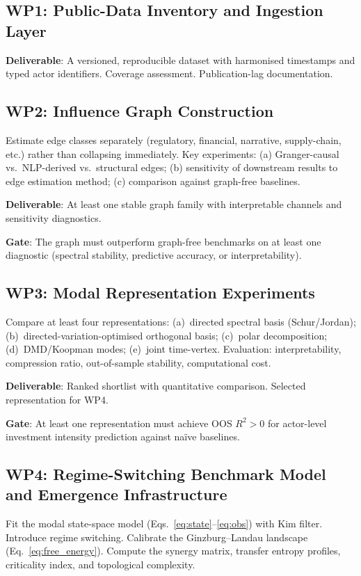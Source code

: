 \documentclass[11pt,a4paper]{article}
\theoremstyle{definition}
\begin{document}
\subsection{WP1: Public-Data Inventory and Ingestion Layer}
\textbf{Deliverable}: A versioned, reproducible dataset with harmonised timestamps and typed actor identifiers. Coverage assessment. Publication-lag documentation.

\subsection{WP2: Influence Graph Construction}
Estimate edge classes separately (regulatory, financial, narrative, supply-chain, etc.) rather than collapsing immediately. Key experiments: (a) Granger-causal vs.\ NLP-derived vs.\ structural edges; (b) sensitivity of downstream results to edge estimation method; (c) comparison against graph-free baselines.

\textbf{Deliverable}: At least one stable graph family with interpretable channels and sensitivity diagnostics.

\textbf{Gate}: The graph must outperform graph-free benchmarks on at least one diagnostic (spectral stability, predictive accuracy, or interpretability).

\subsection{WP3: Modal Representation Experiments}
Compare at least four representations: (a)~directed spectral basis (Schur/Jordan); (b)~directed-variation-optimised orthogonal basis; (c)~polar decomposition; (d)~DMD/Koopman modes; (e)~joint time-vertex. Evaluation: interpretability, compression ratio, out-of-sample stability, computational cost.

\textbf{Deliverable}: Ranked shortlist with quantitative comparison. Selected representation for WP4.

\textbf{Gate}: At least one representation must achieve OOS $R^2 > 0$ for actor-level investment intensity prediction against na\"ive baselines.

\subsection{WP4: Regime-Switching Benchmark Model and Emergence Infrastructure}
\label{sec:wp4}
Fit the modal state-space model (Eqs.~\ref{eq:state}--\ref{eq:obs}) with Kim filter. Introduce regime switching. Calibrate the Ginzburg--Landau landscape (Eq.~\ref{eq:free_energy}). Compute the synergy matrix, transfer entropy profiles, criticality index, and topological complexity.
\end{document}
